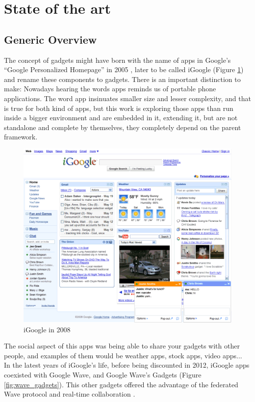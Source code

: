 \newpage
\section{State of the art}

\subsection{Generic Overview}
The concept of gadgets might have born with the name of apps in Google's ``Google Personalized Homepage'' in 2005 \cite{ref:what_happened_to_igoogle}, later to be called iGoogle (Figure \ref{fig:igoogle_2008}) and rename these components to gadgets. There is an important distinction to make: Nowadays hearing the words apps reminds us of portable phone applications. The word app insinuates smaller size and lesser complexity, and that is true for both kind of apps, but this work is exploring those apps than run inside a bigger environment and are embedded in it, extending it, but are not standalone and complete by themselves, they completely depend on the parent framework.
\begin{figure}[H]
  \center
    \includegraphics[keepaspectratio, scale=0.6]{Media/Captures/Soa/iGoogle.png}
  \caption{iGoogle in 2008}
  \label{fig:igoogle_2008}
\end{figure}
The social aspect of this apps was being able to share your gadgets with other people, and examples of them would be weather apps, stock apps, video apps...\\[.2cm]
In the latest years of iGoogle's life, before being discounted in 2012, iGoogle apps coexisted with Google Wave, and Google Wave's Gadgets (Figure \ref{fig:wave_gadgets}). This other gadgets offered the advantage of the federated Wave protocol and real-time collaboration \cite{ref:apache_wave_about}.\\[.2cm]
